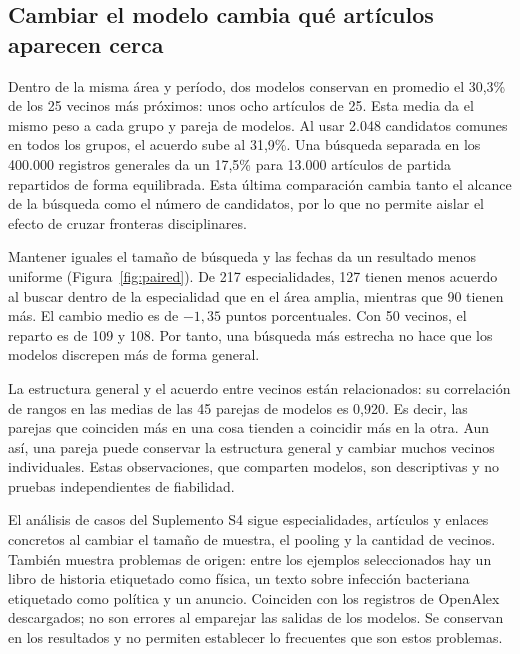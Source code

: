 \documentclass[12pt]{article}
\begin{document}
\FloatBarrier
\subsection{Cambiar el modelo cambia qué artículos aparecen cerca}
Dentro de la misma área y período, dos modelos conservan en promedio el 30,3\% de los 25 vecinos más próximos: unos ocho artículos de 25. Esta media da el mismo peso a cada grupo y pareja de modelos. Al usar 2.048 candidatos comunes en todos los grupos, el acuerdo sube al 31,9\%. Una búsqueda separada en los 400.000 registros generales da un 17,5\% para 13.000 artículos de partida repartidos de forma equilibrada. Esta última comparación cambia tanto el alcance de la búsqueda como el número de candidatos, por lo que no permite aislar el efecto de cruzar fronteras disciplinares.

Mantener iguales el tamaño de búsqueda y las fechas da un resultado menos uniforme (Figura~\ref{fig:paired}). De 217 especialidades, 127 tienen menos acuerdo al buscar dentro de la especialidad que en el área amplia, mientras que 90 tienen más. El cambio medio es de $-1,35$ puntos porcentuales. Con 50 vecinos, el reparto es de 109 y 108. Por tanto, una búsqueda más estrecha no hace que los modelos discrepen más de forma general.

La estructura general y el acuerdo entre vecinos están relacionados: su correlación de rangos en las medias de las 45 parejas de modelos es 0,920. Es decir, las parejas que coinciden más en una cosa tienden a coincidir más en la otra. Aun así, una pareja puede conservar la estructura general y cambiar muchos vecinos individuales. Estas observaciones, que comparten modelos, son descriptivas y no pruebas independientes de fiabilidad.

El análisis de casos del Suplemento S4 sigue especialidades, artículos y enlaces concretos al cambiar el tamaño de muestra, el pooling y la cantidad de vecinos. También muestra problemas de origen: entre los ejemplos seleccionados hay un libro de historia etiquetado como física, un texto sobre infección bacteriana etiquetado como política y un anuncio. Coinciden con los registros de OpenAlex descargados; no son errores al emparejar las salidas de los modelos. Se conservan en los resultados y no permiten establecer lo frecuentes que son estos problemas.
\end{document}
